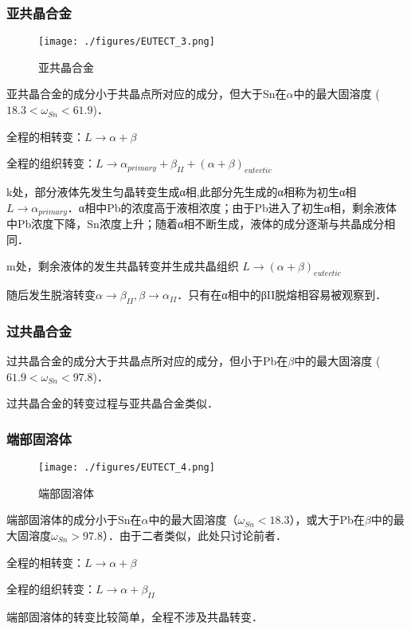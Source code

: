 \subsubsection{亚共晶合金}
\begin{figure}[ht]
\centering
\texttt{[image: ./figures/EUTECT\_3.png]}
\caption{亚共晶合金} \label{EUTECT_fig3}
\end{figure}

亚共晶合金的成分小于共晶点所对应的成分，但大于Sn在$\alpha$中的最大固溶度 ($18.3<\omega_{Sn}<61.9$)．

全程的相转变：$L \rightarrow \alpha+\beta$

全程的组织转变：$L \rightarrow \alpha_{primary}+\beta_{II}+(\alpha+\beta)_{eutectic}$

k处，部分液体先发生匀晶转变生成α相,此部分先生成的α相称为初生α相$L \rightarrow \alpha_{primary}$．α相中Pb的浓度高于液相浓度；由于Pb进入了初生α相，剩余液体中Pb浓度下降，Sn浓度上升；随着α相不断生成，液体的成分逐渐与共晶成分相同．

m处，剩余液体的发生共晶转变并生成共晶组织 $L \rightarrow (\alpha+\beta)_{eutectic}$

随后发生脱溶转变$\alpha \rightarrow \beta_{II}, \beta \rightarrow \alpha_{II}$．只有在α相中的βII脱熔相容易被观察到．

\subsubsection{过共晶合金}
过共晶合金的成分大于共晶点所对应的成分，但小于Pb在$\beta$中的最大固溶度 ($61.9<\omega_{Sn}<97.8$)．

过共晶合金的转变过程与亚共晶合金类似．

\subsubsection{端部固溶体}
\begin{figure}[ht]
\centering
\texttt{[image: ./figures/EUTECT\_4.png]}
\caption{端部固溶体} \label{EUTECT_fig4}
\end{figure}
端部固溶体的成分小于Sn在$\alpha$中的最大固溶度（$\omega_{Sn}<18.3$），或大于Pb在$\beta$中的最大固溶度$\omega_{Sn}>97.8$）．由于二者类似，此处只讨论前者．

全程的相转变：$L \rightarrow \alpha+\beta$

全程的组织转变：$L \rightarrow \alpha+ \beta_{II}$

端部固溶体的转变比较简单，全程不涉及共晶转变．

